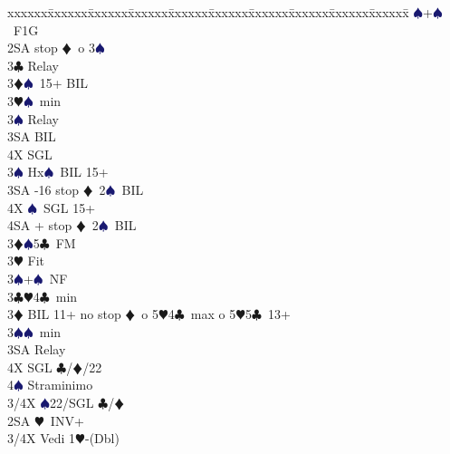 \documentclass[a4paper,italian]{article}
\newcommand{\BC}{\textcolor{OliveGreen}{$\clubsuit$}}
\newcommand{\BD}{\textcolor{RedOrange}{$\vardiamondsuit$}}
\newcommand{\BH}{\textcolor{Red2}{$\varheartsuit${}}}
\newcommand{\BS}{\textcolor{MidnightBlue}{$\spadesuit${}}}
\newenvironment{bidtable}
{\begin{tabbing}

    xxxxxx\=xxxxxx\=xxxxxx\=xxxxxx\=xxxxxx\=xxxxxx\=xxxxxx\=xxxxxx\=xxxxxx\=xxxxxx\=\kill}
{\end{tabbing} }%
\begin{document}
\begin{multicols}{2}
\begin{bidtable}
                                            \BS {}+\BS\ F1G\+\+\\
                                            2SA  stop \BD\ o 3\BS \+\\
                                            3\BC \> Relay\+\\
                                            3\BD {}\BS\ 15+ BIL\\
                                            3\BH {}\BS\ min\+\\
                                            3\BS \> Relay\+\\
                                            3SA \> BIL\\
                                            4X \> SGL\-\-\\
                                            3\BS \> Hx\BS\ BIL 15+\\
                                            3SA -16 stop \BD\ 2\BS\ BIL\\
                                            4X \BS\ SGL 15+\\
                                            4SA + stop \BD\ 2\BS\ BIL\-\\
                                            3\BD {}\BS 5\BC\ FM\\
                                            3\BH \> Fit\\
                                            3\BS {}+\BS\ NF\-\\
                                            3\BC {}\BH 4\BC\ min\\
                                            3\BD \> BIL 11+ no stop \BD\ o 5\BH 4\BC\ max o 5\BH 5\BC\ 13+\\
                                            3\BS {}\BS\ min\+\\
                                            3SA \> Relay\+\\
                                            4X \> SGL \BC /\BD /22\\
                                            4\BS \> Straminimo\-\-\\
                                            3/4X \BS 22/SGL \BC /\BD \-\\
                                            2SA \BH\ INV+\\
                                            3/4X \> Vedi 1\BH -(Dbl)\-
                                        \end{bidtable}

                                    \end{multicols}
                                    \newpage
\end{document}
